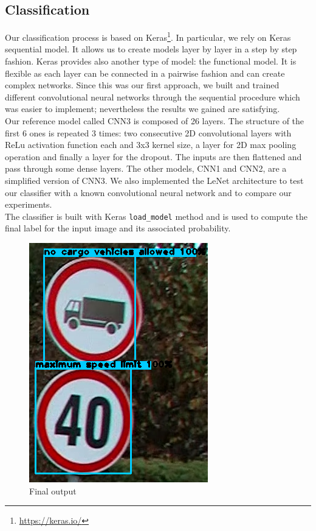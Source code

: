 \subsection{Classification}
Our classification process is based on Keras\footnote{\url{https://keras.io/}}. In particular, we rely on Keras sequential model. It allows us to create models layer by layer in a step by step fashion. Keras provides also another type of model: the functional model. It is flexible as each layer can be connected in a pairwise fashion and can create complex networks. Since this was our first approach, we built and trained different convolutional neural networks through the sequential procedure which was easier to implement; nevertheless the results we gained are satisfying.\\
Our reference model called CNN3 is composed of 26 layers. The structure of the first 6 ones is repeated 3 times: two consecutive 2D convolutional layers with ReLu activation function each and $3$x$3$ kernel size, a layer for 2D max pooling operation and finally a layer for the dropout. The inputs are then flattened and pass through some dense layers. The other models, CNN1 and CNN2, are a simplified version of CNN3. We also implemented the LeNet architecture to test our classifier with a known convolutional neural network and to compare our experiments.\\
The classifier is built with Keras \texttt{load\_model} method and is used to compute the final label for the input image and its associated probability.
\begin{figure}[h]
	\centering\includegraphics[scale=0.5]{Res/Immagini/classExample.png}	
	\caption{Final output}
\end{figure}
